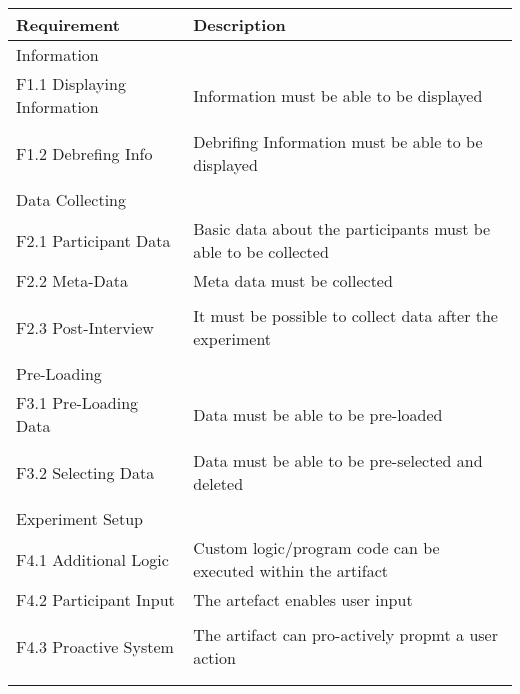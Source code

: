 \begin{table}
    \centering
    \small
    \begin{tabular}{L{0.35\textwidth}L{0.59\textwidth}}
    \hline
    Requirement                     & Description \\ \hline
    Information                 &             \\ \hline
    F1.1 Displaying Information     & Information must be able to be displayed            \\
     & \\
    F1.2 Debrefing Info             & Debrifing Information must be able to be displayed           \\
    & \\ \hline
    Data Collecting             &             \\ \hline
    F2.1 Participant Data           & Basic data about the participants must be able to be collected           \\
    F2.2 Meta-Data                  & Meta data must be collected            \\
    & \\
    F2.3 Post-Interview             & It must be possible to collect data after the experiment            \\
    & \\  \hline
    Pre-Loading                 &             \\ \hline
    F3.1 Pre-Loading Data           & Data must be able to be pre-loaded            \\
    & \\
    F3.2 Selecting Data             & Data must be able to be pre-selected and deleted           \\
    & \\ \hline
    Experiment Setup            &             \\ \hline
    F4.1 Additional Logic           & Custom logic/program code can be executed within the artifact            \\
    F4.2 Participant Input          & The artefact enables user input            \\
    & \\
    F4.3 Proactive System           & The artifact can pro-actively propmt a user action           \\
    & \\ \hline

\end{tabular}
\end{table}
